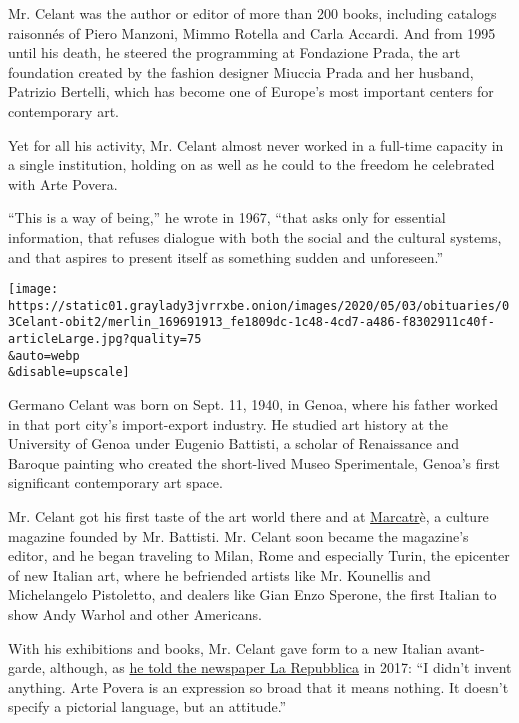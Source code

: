 Mr. Celant was the author or editor of more than 200 books, including
catalogs raisonnés of Piero Manzoni, Mimmo Rotella and Carla Accardi.
And from 1995 until his death, he steered the programming at Fondazione
Prada, the art foundation created by the fashion designer Miuccia Prada
and her husband, Patrizio Bertelli, which has become one of Europe's
most important centers for contemporary art.

Yet for all his activity, Mr. Celant almost never worked in a full-time
capacity in a single institution, holding on as well as he could to the
freedom he celebrated with Arte Povera.

``This is a way of being,'' he wrote in 1967, ``that asks only for
essential information, that refuses dialogue with both the social and
the cultural systems, and that aspires to present itself as something
sudden and unforeseen.''

\texttt{[image: https://static01.graylady3jvrrxbe.onion/images/2020/05/03/obituaries/03Celant-obit2/merlin\_169691913\_fe1809dc-1c48-4cd7-a486-f8302911c40f-articleLarge.jpg?quality=75\\\&auto=webp\\\&disable=upscale]}

Germano Celant was born on Sept. 11, 1940, in Genoa, where his father
worked in that port city's import-export industry. He studied art
history at the University of Genoa under Eugenio Battisti, a scholar of
Renaissance and Baroque painting who created the short-lived Museo
Sperimentale, Genoa's first significant contemporary art space.

Mr. Celant got his first taste of the art world there and at
\href{http://www.capti.it/index.php?ParamCatID=10\&IDFascicolo=192\&artgal=38\&lang=EN}{Marcatr}è,
a culture magazine founded by Mr. Battisti. Mr. Celant soon became the
magazine's editor, and he began traveling to Milan, Rome and especially
Turin, the epicenter of new Italian art, where he befriended artists
like Mr. Kounellis and Michelangelo Pistoletto, and dealers like Gian
Enzo Sperone, the first Italian to show Andy Warhol and other Americans.

With his exhibitions and books, Mr. Celant gave form to a new Italian
avant-garde, although, as
\href{https://www.repubblica.it/cultura/2017/05/07/news/germano_celant_non_dite_che_ho_inventato_l_arte_povera_e_un_espressione_cosi_ampia_da_non_significare_nulla_-164857041/}{he
told the newspaper La Repubblica} in 2017: ``I didn't invent anything.
Arte Povera is an expression so broad that it means nothing. It doesn't
specify a pictorial language, but an attitude.''

